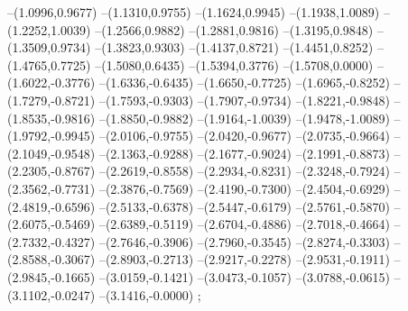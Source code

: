 {--(1.0996,0.9677)
--(1.1310,0.9755)
--(1.1624,0.9945)
--(1.1938,1.0089)
--(1.2252,1.0039)
--(1.2566,0.9882)
--(1.2881,0.9816)
--(1.3195,0.9848)
--(1.3509,0.9734)
--(1.3823,0.9303)
--(1.4137,0.8721)
--(1.4451,0.8252)
--(1.4765,0.7725)
--(1.5080,0.6435)
--(1.5394,0.3776)
--(1.5708,0.0000)
--(1.6022,-0.3776)
--(1.6336,-0.6435)
--(1.6650,-0.7725)
--(1.6965,-0.8252)
--(1.7279,-0.8721)
--(1.7593,-0.9303)
--(1.7907,-0.9734)
--(1.8221,-0.9848)
--(1.8535,-0.9816)
--(1.8850,-0.9882)
--(1.9164,-1.0039)
--(1.9478,-1.0089)
--(1.9792,-0.9945)
--(2.0106,-0.9755)
--(2.0420,-0.9677)
--(2.0735,-0.9664)
--(2.1049,-0.9548)
--(2.1363,-0.9288)
--(2.1677,-0.9024)
--(2.1991,-0.8873)
--(2.2305,-0.8767)
--(2.2619,-0.8558)
--(2.2934,-0.8231)
--(2.3248,-0.7924)
--(2.3562,-0.7731)
--(2.3876,-0.7569)
--(2.4190,-0.7300)
--(2.4504,-0.6929)
--(2.4819,-0.6596)
--(2.5133,-0.6378)
--(2.5447,-0.6179)
--(2.5761,-0.5870)
--(2.6075,-0.5469)
--(2.6389,-0.5119)
--(2.6704,-0.4886)
--(2.7018,-0.4664)
--(2.7332,-0.4327)
--(2.7646,-0.3906)
--(2.7960,-0.3545)
--(2.8274,-0.3303)
--(2.8588,-0.3067)
--(2.8903,-0.2713)
--(2.9217,-0.2278)
--(2.9531,-0.1911)
--(2.9845,-0.1665)
--(3.0159,-0.1421)
--(3.0473,-0.1057)
--(3.0788,-0.0615)
--(3.1102,-0.0247)
--(3.1416,-0.0000)
;}
